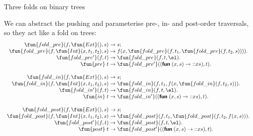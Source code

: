 %
\begin{frame}{Three folds on binary trees}

  We can abstract the pushing and parameterise pre-, in- and
  post\hyp{}order traversals, so they act like a fold on trees:
  \begin{equation*}
    \begin{array}{r@{\;}l@{\;}l@{}}
      \fun{fold\_pre}(f, \fun{Ext}(), s) & \rightarrow & s; \\
      \fun{fold\_pre}(f, \fun{Int}(x, t_1, t_2), s) & \rightarrow
      & f(x, \fun{fold\_pre}(f, t_1, \fun{fold\_pre}(f, t_2, s)))).\\
      \fun{fold\_pre'}(f, t) & \rightarrow & \fun{fold\_pre}(f, t, \el).\\
      \fun{pre} \; t & \rightarrow & \fun{fold\_pre'}((\Xfun \; (x, s) \rightarrow \cons{x}{s}), t).\\\\
      \fun{fold\_in}(f, \fun{Ext}(), s) & \rightarrow & s; \\
      \fun{fold\_in}(f, \fun{Int}(x, t_1, t_2), s) & \rightarrow
      & \fun{fold\_in}(f, t_1, f (x, \fun{fold\_in}(f, t_2, s))).\\
      \fun{fold\_in'}(f, t) & \rightarrow & \fun{fold\_in}(f, t, \el).\\
      \fun{in} \; t & \rightarrow & \fun{fold\_in'}((\Xfun \; (x, s) \rightarrow \cons{x}{s}), t).\\\\
      \fun{fold\_post}(f, \fun{Ext}(), s) & \rightarrow & s; \\
      \fun{fold\_post}(f, \fun{Int}(x, t_1, t_2), s) & \rightarrow
      & \fun{fold\_post}(f, t_1, \fun{fold\_post}(f, t_2, f(x,s))).\\
      \fun{fold\_post'} (f, t) & \rightarrow & \fun{fold\_post}(f, t, \el).\\
      \fun{post} \; t & \rightarrow & \fun{fold\_post'}((\Xfun \; (x, s) \rightarrow \cons{x}{s}), t).
    \end{array}
  \end{equation*}

\end{frame}

